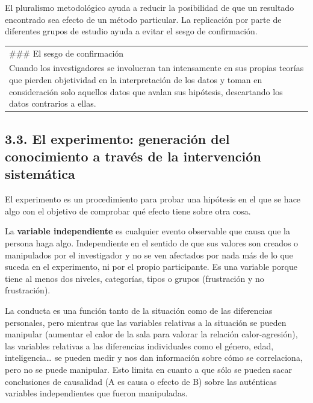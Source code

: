 \documentclass[
]{website}
\begin{document}
El pluralismo metodológico ayuda a reducir la posibilidad de que un resultado encontrado sea efecto de un método particular. La replicación por parte de diferentes grupos de estudio ayuda a evitar el sesgo de confirmación.

\begin{longtable}[]{@{}
  >{\raggedright\arraybackslash}p{}@{}}
\toprule\noalign{}
\endhead
\bottomrule\noalign{}
\endlastfoot
\#\#\# El sesgo de confirmación \\
Cuando los investigadores se involucran tan intensamente en sus propias teorías que pierden objetividad en la interpretación de los datos y toman en consideración solo aquellos datos que avalan sus hipótesis, descartando los datos contrarios a ellas. \\
\end{longtable}

\subsection*{3.3. El experimento: generación del conocimiento a través de la intervención sistemática}\label{subtema3_3}

El experimento es un procedimiento para probar una hipótesis en el que se hace algo con el objetivo de comprobar qué efecto tiene sobre otra cosa.

La \textbf{variable independiente} es cualquier evento observable que causa que la persona haga algo. Independiente en el sentido de que sus valores son creados o manipulados por el investigador y no se ven afectados por nada más de lo que suceda en el experimento, ni por el propio participante. Es una variable porque tiene al menos dos niveles, categorías, tipos o grupos (frustración y no frustración).

La conducta es una función tanto de la situación como de las diferencias personales, pero mientras que las variables relativas a la situación se pueden manipular (aumentar el calor de la sala para valorar la relación calor-agresión), las variables relativas a las diferencias individuales como el género, edad, inteligencia\ldots{} se pueden medir y nos dan información sobre cómo se correlaciona, pero no se puede manipular. Esto limita en cuanto a que sólo se pueden sacar conclusiones de causalidad (A es causa o efecto de B) sobre las auténticas variables independientes que fueron manipuladas.
\end{document}
